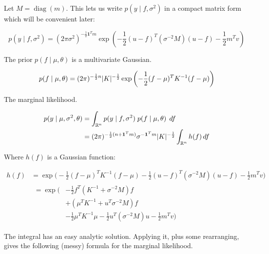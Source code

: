 \documentclass{article}
\newcommand{\dif}{\mathop{}\!{d}}
\newcommand{\one}{\mathbf{1}}
\newcommand{\real}{\mathbb{R}}
\DeclareMathOperator{\diag}{diag}
\DeclarePairedDelimiter{\Det}{\lvert}{\rvert}
\begin{document}
Let $M = \diag(m)$.
This lets us write $p(y \mid f, \sigma^2)$ in a compact matrix form which will be convenient later:

\begin{equation}
    p(y \mid f, \sigma^2)
    =
    (2 \pi \sigma^2)^{-\frac{1}{2} \one^T m}
    \exp \left(
        -\frac{1}{2} (u - f)^T (\sigma^{-2} M) (u - f)
        -\frac{1}{2} m^T v
    \right)
\end{equation}

The prior $p(f \mid \mu, \theta)$ is a multivariate Gaussian.

\begin{equation}
    p(f \mid \mu, \theta)
    =
    (2 \pi)^{-\frac{1}{2} n}
    \Det{K}^{-\frac{1}{2}}
    \exp \left(
        -\frac{1}{2} (f - \mu)^T K^{-1} (f - \mu)
    \right)
\end{equation}

The marginal likelihood.

\begin{align}
    p(y \mid \mu, \sigma^2, \theta)
    &=
    \int_{\real^n}
    p(y \mid f, \sigma^2) \;
    p(f \mid \mu, \theta) \;
    \dif f
    \\ &=
    (2 \pi)^{-\frac{1}{2} (n + \one^T m)}
    \sigma^{-\one^T m}
    \Det{K}^{-\frac{1}{2}}
    \int_{\real^n} h(f) \dif f
\end{align}

Where $h(f)$ is a Gaussian function:

\begin{align}
    h(f)
    &=
    \exp \biggl(
        - \frac{1}{2} (f - \mu)^T K^{-1} (f - \mu)
        - \frac{1}{2} (u - f)^T (\sigma^{-2} M) (u - f)
        - \frac{1}{2} m^T v
    \biggr)
    \\ &
    \begin{aligned}
    = \exp \biggl(
        &
        - \frac{1}{2} f^T (K^{-1} + \sigma^{-2} M) f
        \\ &
        + (\mu^T K^{-1} + u^T \sigma^{-2} M) f
        \\ &
        - \frac{1}{2} \mu^T K^{-1} \mu
        - \frac{1}{2} u^T (\sigma^{-2} M) u
        - \frac{1}{2} m^T v
    \biggr)
    \end{aligned}
\end{align}

The integral has an easy analytic solution.
Applying it, plus some rearranging, gives the following (messy) formula for the marginal likelihood.
\end{document}
